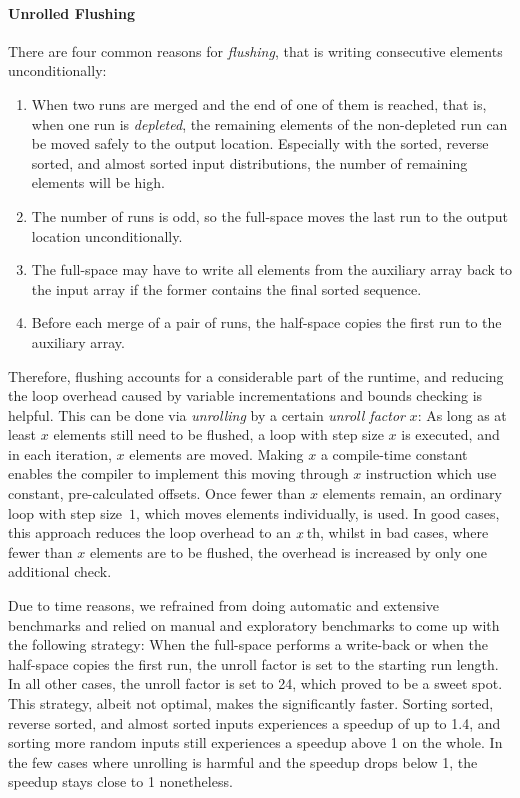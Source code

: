 \paragraph{Unrolled Flushing}
There are four common reasons for \emph{flushing}, that is writing consecutive elements unconditionally:
\begin{enumerate}
	\item
	When two runs are merged and the end of one of them is reached, that is, when one run is \emph{depleted}, the remaining elements of the non-depleted run can be moved safely to the output location.
	Especially with the sorted, reverse sorted, and almost sorted input distributions, the number of remaining elements will be high.

	\item
	The number of runs is odd, so the full-space \MS{} moves the last run to the output location unconditionally.

	\item
	The full-space \MS{} may have to write all elements from the auxiliary array back to the input array if the former contains the final sorted sequence.

	\item
	Before each merge of a pair of runs, the half-space \MS{} copies the first run to the auxiliary array.
\end{enumerate}
Therefore, flushing accounts for a considerable part of the runtime, and reducing the loop overhead caused by variable incrementations and bounds checking is helpful.
This can be done via \emph{unrolling} by a certain \emph{unroll factor} \(x\):
As long as at least \(x\) elements still need to be flushed, a loop with step size \(x\) is executed, and in each iteration, \(x\) elements are moved.
Making \(x\) a compile-time constant enables the compiler to implement this moving through \(x\) instruction which use constant, pre-calculated offsets.
Once fewer than \(x\) elements remain, an ordinary loop with step size~\(1\), which moves elements individually, is used.
In good cases, this approach reduces the loop overhead to an \(x\kern .125em\)th, whilst in bad cases, where fewer than \(x\) elements are to be flushed, the overhead is increased by only one additional check.

Due to time reasons, we refrained from doing automatic and extensive benchmarks and relied on manual and exploratory benchmarks to come up with the following strategy:
When the full-space \MS{} performs a write-back or when the half-space \MS{} copies the first run, the unroll factor is set to the starting run length.
In all other cases, the unroll factor is set to 24, which proved to be a sweet spot.
This strategy, albeit not optimal, makes the \MS*{} significantly faster.
Sorting sorted, reverse sorted, and almost sorted inputs experiences a speedup of up to \num{1.4}, and sorting more random inputs still experiences a speedup above \num{1} on the whole.
In the few cases where unrolling is harmful and the speedup drops below \num{1}, the speedup stays close to \num{1} nonetheless.


